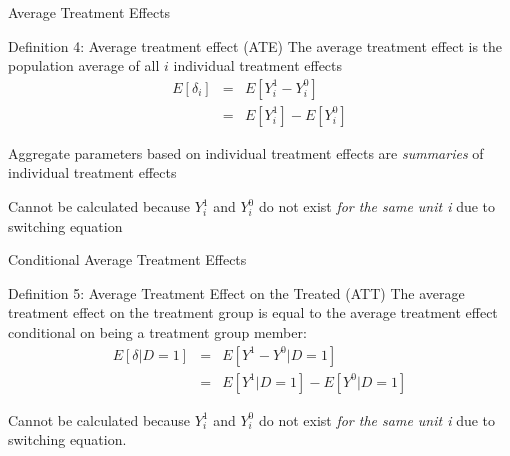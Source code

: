 \documentclass{beamer}
\begin{document}
\begin{frame}{Average Treatment Effects}

  \begin{block}{Definition 4: Average treatment effect (ATE)}
    The average treatment effect is the population average of all $i$ individual treatment effects
    \begin{eqnarray*}
      E[\delta_i]&=&E[Y_i^1-Y_i^0]\\
      &=&E[Y^1_i] - E[Y^0_i]
    \end{eqnarray*}
  \end{block}

  \bigskip

Aggregate parameters based on individual treatment effects are \emph{summaries} of individual treatment effects

\bigskip

  Cannot be calculated because $Y^1_i$ and $Y^0_i$ do not exist \emph{for the same unit i} due to switching equation

\end{frame}



\begin{frame}{Conditional Average Treatment Effects}


  \begin{block}{Definition 5: Average Treatment Effect on the Treated (ATT)}
    The average treatment effect on the treatment group is equal to the average treatment effect conditional on being a treatment group member:
    \begin{eqnarray*}
      E[\delta|D=1]&=&E[Y^1-Y^0|D=1] \nonumber \\
      &=&E[Y^1|D=1]-E[Y^0|D=1]
    \end{eqnarray*}
  \end{block}
  Cannot be calculated because $Y^1_i$ and $Y^0_i$ do not exist \emph{for the same unit i} due to switching equation. 


\end{frame}
\end{document}
